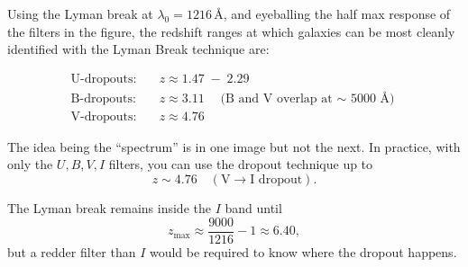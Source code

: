 Using the Lyman break at $\lambda_0 = 1216 \, \text{\AA}$, and eyeballing the half max response of the filters in the figure, the redshift ranges at which galaxies can be most cleanly identified with the Lyman Break technique are:

\[
\begin{aligned}
\text{U-dropouts:} & \quad z \approx 1.47 \;-\; 2.29 \\
\text{B-dropouts:} & \quad z \approx 3.11 \quad \text{(B and V overlap at $\sim$ 5000 \AA)} \\
\text{V-dropouts:} & \quad z \approx 4.76
\end{aligned}
\]

The idea being the ``spectrum'' is in one image but not the next. In practice, with only the $U, B, V, I$ filters, you can use the dropout technique up to 
\[
z \sim 4.76 \quad (\text{V} \to \text{I dropout}).
\]

The Lyman break remains inside the $I$ band until 
\[
z_{\max} \approx \frac{9000}{1216} - 1 \approx 6.40,
\]
but a redder filter than $I$ would be required to know where the dropout happens. 









